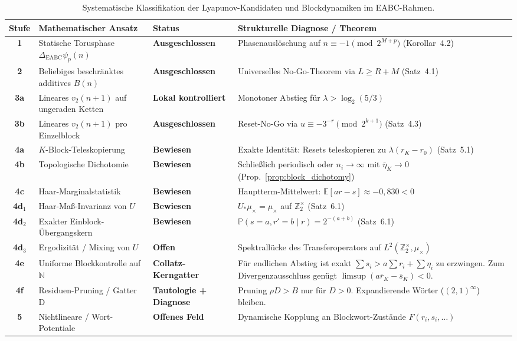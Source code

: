 \documentclass[11pt,reqno]{amsart}
\theoremstyle{definition}
\theoremstyle{remark}
\numberwithin{equation}{section}
\begin{document}
\begin{table}[h!]
\centering
\small
\renewcommand{\arraystretch}{1.3}
\begin{tabular}{clll}
\toprule
\textbf{Stufe} & \textbf{Mathematischer Ansatz} & \textbf{Status} & \textbf{Strukturelle Diagnose / Theorem} \\
\midrule
\textbf{1} & Statische Torusphase $\Delta_{\mathrm{EABC}} \psi_p(n)$ & \textbf{Ausgeschlossen} & Phasenauslöschung auf $n \equiv -1 \pmod{2^{M+p}}$ (Korollar~4.2) \\
\textbf{2} & Beliebiges beschränktes additives $B(n)$ & \textbf{Ausgeschlossen} & Universelles No-Go-Theorem via $L \ge R+M$ (Satz~4.1) \\
\textbf{3a} & Lineares $v_2(n+1)$ auf ungeraden Ketten & \textbf{Lokal kontrolliert} & Monotoner Abstieg für $\lambda > \log_2(5/3)$ \\
\textbf{3b} & Lineares $v_2(n+1)$ pro Einzelblock & \textbf{Ausgeschlossen} & Reset-No-Go via $u \equiv -3^{-r} \pmod{2^{k+1}}$ (Satz~4.3) \\
\midrule
\textbf{4a} & $K$-Block-Teleskopierung & \textbf{Bewiesen} & Exakte Identität: Resets teleskopieren zu $\lambda(r_K - r_0)$ (Satz~5.1) \\
\textbf{4b} & Topologische Dichotomie & \textbf{Bewiesen} & Schließlich periodisch oder $n_i \to \infty$ mit $\bar{\eta}_K \to 0$ (Prop.~\ref{prop:block_dichotomy}) \\
\textbf{4c} & Haar-Marginalstatistik & \textbf{Bewiesen} & Hauptterm-Mittelwert: $\mathbb{E}[a r - s] \approx -0{,}830 < 0$ \\
\textbf{4d$_1$} & Haar-Maß-Invarianz von $U$ & \textbf{Bewiesen} & $U_* \mu_\times = \mu_\times$ auf $\mathbb{Z}_2^\times$ (Satz~6.1) \\
\textbf{4d$_2$} & Exakter Einblock-Übergangskern & \textbf{Bewiesen} & $\mathbb{P}(s=a, r'=b \mid r) = 2^{-(a+b)}$ (Satz~6.1) \\
\textbf{4d$_3$} & Ergodizität / Mixing von $U$ & \textbf{Offen} & Spektrallücke des Transferoperators auf $L^2(\mathbb{Z}_2^\times, \mu_\times)$ \\
\midrule
\textbf{4e} & Uniforme Blockkontrolle auf $\mathbb{N}$ & \textbf{Collatz-Kerngatter} &
\parbox[t]{6.8cm}{Für endlichen Abstieg ist exakt
$\sum s_i > a \sum r_i + \sum \eta_i$ zu erzwingen. Zum Divergenzausschluss genügt $\limsup (a \bar{r}_K - \bar{s}_K) < 0$.} \\
\textbf{4f} & Residuen-Pruning / Gatter D & \textbf{Tautologie + Diagnose} &
\parbox[t]{6.8cm}{Pruning $\rho D>B$ nur für $D>0$.
Expandierende Wörter ($(2,1)^\infty$) bleiben.} \\
\textbf{5} & Nichtlineare / Wort-Potentiale & \textbf{Offenes Feld} & Dynamische Kopplung an Blockwort-Zustände $F(r_i, s_i, \dots)$ \\
\bottomrule
\end{tabular}
\caption{Systematische Klassifikation der Lyapunov-Kandidaten und Blockdynamiken im EABC-Rahmen.}
\label{tab:final_research_ladder}
\end{table}
\end{document}
